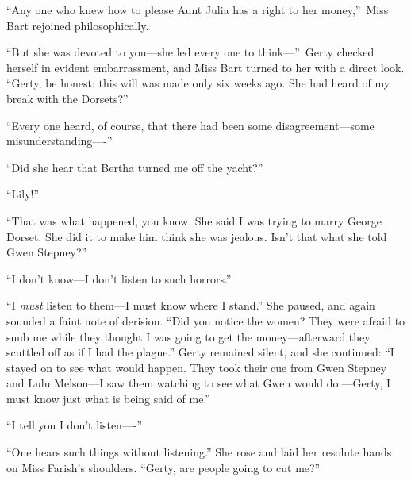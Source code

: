 \documentclass[12pt,a4paper]{book}
\begin{document}
``Any one who knew how to please Aunt Julia has a right to her
money,''\ Miss Bart rejoined philosophically.





``But she was devoted to you---she led every one to think---''\ Gerty
checked herself in evident embarrassment, and Miss Bart turned to
her with a direct look. ``Gerty, be honest: this will was made
only six weeks ago. She had heard of my break with the Dorsets?''





``Every one heard, of course, that there had been some
disagreement---some misunderstanding----''





``Did she hear that Bertha turned me off the yacht?''





``Lily!''





``That was what happened, you know. She said I was trying to marry
George Dorset. She did it to make him think she was jealous. 
Isn't that what she told Gwen Stepney?''





``I don't know---I don't listen to such horrors.''





``I \textit{must} listen to them---I must know where I stand.'' She paused,
and again sounded a faint note of derision. ``Did you
notice the women? They were afraid to snub me while they thought
I was going to get the money---afterward they scuttled off as if I
had the plague.'' Gerty remained silent, and she continued: ``I
stayed on to see what would happen. They took their cue from Gwen
Stepney and Lulu Melson---I saw them watching to see what Gwen
would do.---Gerty, I must know just what is being said of me.''





``I tell you I don't listen----''





``One hears such things without listening.'' She rose and laid her
resolute hands on Miss Farish's shoulders. ``Gerty, are people
going to cut me?''
\end{document}
